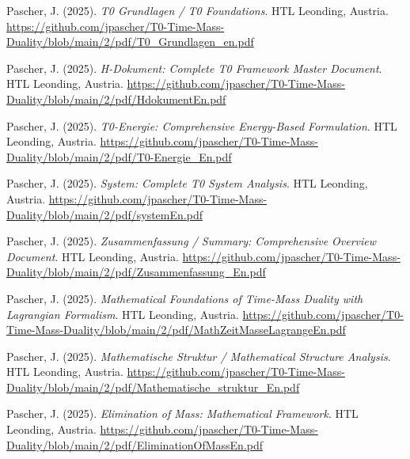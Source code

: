 \documentclass{article}
\begin{document}
	\begin{thebibliography}{99}
		
		
		Pascher, J. (2025).
		\textit{T0 Grundlagen / T0 Foundations}.
		HTL Leonding, Austria.
		\url{https://github.com/jpascher/T0-Time-Mass-Duality/blob/main/2/pdf/T0_Grundlagen_en.pdf}
		
		Pascher, J. (2025).
		\textit{H-Dokument: Complete T0 Framework Master Document}.
		HTL Leonding, Austria.
		\url{https://github.com/jpascher/T0-Time-Mass-Duality/blob/main/2/pdf/HdokumentEn.pdf}
		
		Pascher, J. (2025).
		\textit{T0-Energie: Comprehensive Energy-Based Formulation}.
		HTL Leonding, Austria.
		\url{https://github.com/jpascher/T0-Time-Mass-Duality/blob/main/2/pdf/T0-Energie_En.pdf}
		
		Pascher, J. (2025).
		\textit{System: Complete T0 System Analysis}.
		HTL Leonding, Austria.
		\url{https://github.com/jpascher/T0-Time-Mass-Duality/blob/main/2/pdf/systemEn.pdf}
		
		Pascher, J. (2025).
		\textit{Zusammenfassung / Summary: Comprehensive Overview Document}.
		HTL Leonding, Austria.
		\url{https://github.com/jpascher/T0-Time-Mass-Duality/blob/main/2/pdf/Zusammenfassung_En.pdf}
		
		
		Pascher, J. (2025).
		\textit{Mathematical Foundations of Time-Mass Duality with Lagrangian Formalism}.
		HTL Leonding, Austria.
		\url{https://github.com/jpascher/T0-Time-Mass-Duality/blob/main/2/pdf/MathZeitMasseLagrangeEn.pdf}
		
		Pascher, J. (2025).
		\textit{Mathematische Struktur / Mathematical Structure Analysis}.
		HTL Leonding, Austria.
		\url{https://github.com/jpascher/T0-Time-Mass-Duality/blob/main/2/pdf/Mathematische_struktur_En.pdf}
		
		Pascher, J. (2025).
		\textit{Elimination of Mass: Mathematical Framework}.
		HTL Leonding, Austria.
		\url{https://github.com/jpascher/T0-Time-Mass-Duality/blob/main/2/pdf/EliminationOfMassEn.pdf}
		

\end{thebibliography}
\end{document}
